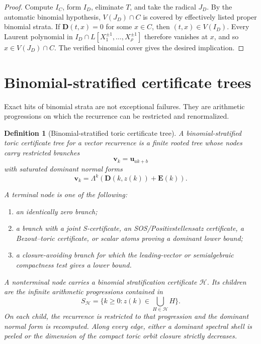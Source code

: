 \documentclass[11pt]{article}
\newtheorem{definition}[theorem]{Definition}
\begin{document}
\begin{proof}
Compute \(I_C\), form \(I_D\), eliminate \(T\), and take the radical \(J_D\). By the automatic binomial hypothesis, \(V(J_D)\cap C\) is covered by effectively listed proper binomial strata. If \(\mathbf D(t,x)=0\) for some \(x\in C\), then \((t,x)\in V(I_D)\). Every Laurent polynomial in \(I_D\cap L[X_1^{\pm1},\ldots,X_\rho^{\pm1}]\) therefore vanishes at \(x\), and so \(x\in V(J_D)\cap C\). The verified binomial cover gives the desired implication.
\end{proof}

\section{Binomial-stratified certificate trees}

Exact hits of binomial strata are not exceptional failures. They are arithmetic progressions on which the recurrence can be restricted and renormalized.

\begin{definition}[Binomial-stratified toric certificate tree]
A binomial-stratified toric certificate tree for a vector recurrence is a finite rooted tree whose nodes carry restricted branches
\[
\mathbf v_k=\mathbf u_{ak+b}
\]
with saturated dominant normal forms
\[
\mathbf v_k=\Lambda^k(\mathbf D(k,z(k))+\mathbf E(k)).
\]

A terminal node is one of the following:
\begin{enumerate}
\item an identically zero branch;
\item a branch with a joint S-certificate, an SOS/Positivstellensatz certificate, a Bezout--toric certificate, or scalar atoms proving a dominant lower bound;
\item a closure-avoiding branch for which the leading-vector or semialgebraic compactness test gives a lower bound.
\end{enumerate}

A nonterminal node carries a binomial stratification certificate \(\mathcal H\). Its children are the infinite arithmetic progressions contained in
\[
S_{\mathcal H}=
\{k\ge0:z(k)\in\bigcup_{H\in\mathcal H}H\}.
\]
On each child, the recurrence is restricted to that progression and the dominant normal form is recomputed. Along every edge, either a dominant spectral shell is peeled or the dimension of the compact toric orbit closure strictly decreases.
\end{definition}
\end{document}
